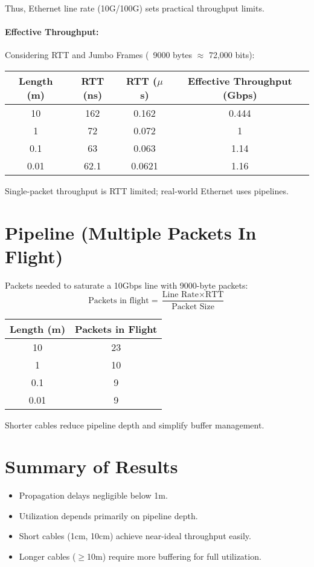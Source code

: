 \documentclass[../HFT-main.tex]{subfiles} %
\begin{document}
Thus, Ethernet line rate (10G/100G) sets practical throughput limits.

\paragraph{Effective Throughput:}
Considering RTT and Jumbo Frames (~9000 bytes $\approx$ 72,000 bits):

\begin{tabular}{@{}cccc@{}}
\toprule
Length (m) & RTT (ns) & RTT ($\mu$s) & Effective Throughput (Gbps) \\
\midrule
10 & 162 & 0.162 & 0.444 \\
1 & 72 & 0.072 & 1 \\
0.1 & 63 & 0.063 & 1.14 \\
0.01 & 62.1 & 0.0621 & 1.16 \\
\bottomrule
\end{tabular}

Single-packet throughput is RTT limited; real-world Ethernet uses pipelines.

\section{Pipeline (Multiple Packets In Flight)}

Packets needed to saturate a 10Gbps line with 9000-byte packets:
\[
\text{Packets in flight} = \frac{\text{Line Rate} \times \text{RTT}}{\text{Packet Size}}
\]

\begin{tabular}{@{}cc@{}}
\toprule
Length (m) & Packets in Flight \\
\midrule
10 & 23 \\
1 & 10 \\
0.1 & 9 \\
0.01 & 9 \\
\bottomrule
\end{tabular}

Shorter cables reduce pipeline depth and simplify buffer management.

\section{Summary of Results}
\begin{itemize}
	\item Propagation delays negligible below 1m.
	\item Utilization depends primarily on pipeline depth.
	\item Short cables (1cm, 10cm) achieve near-ideal throughput easily.
	\item Longer cables ($\geq$10m) require more buffering for full utilization.
\end{itemize}
\end{document}
